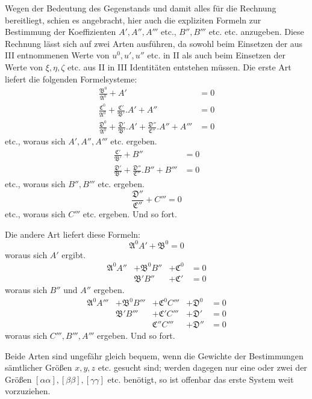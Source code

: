 Wegen der Bedeutung des Gegenstands und damit alles für die Rechnung bereitliegt, schien es angebracht, hier auch die expliziten Formeln zur Bestimmung der Koeffizienten \(A',A'',A'''\) etc., \(B'',B'''\) etc. etc. anzugeben. Diese Rechnung lässt sich auf zwei Arten ausführen, da sowohl beim Einsetzen der aus III entnommenen Werte von \(u^0,u',u''\) etc. in II als auch beim Einsetzen der Werte von \(\xi,\eta,\zeta\) etc. aus II in III Identitäten entstehen müssen. Die erste Art liefert die folgenden Formelsysteme:
\[
\begin{aligned}
\frac{\mathfrak{B}^0}{\mathfrak{A}^0}+A'&=0\\[4pt]
\frac{\mathfrak{C}^0}{\mathfrak{A}^0}+\frac{\mathfrak{C}'}{\mathfrak{B}'}.A'+A''&=0\\[4pt]
\frac{\mathfrak{D}^0}{\mathfrak{A}^0}+\frac{\mathfrak{D}'}{\mathfrak{B}'}.A'+\frac{\mathfrak{D}''}{\mathfrak{C}''}.A''+A'''&=0
\end{aligned}
\]
etc., woraus sich \(A',A'',A'''\) etc. ergeben.
\[
\begin{aligned}
\frac{\mathfrak{C}'}{\mathfrak{B}'}+B''&=0\\[4pt]
\frac{\mathfrak{D}'}{\mathfrak{B}'}+\frac{\mathfrak{D}''}{\mathfrak{C}''}.B''+B'''&=0
\end{aligned}
\]
etc., woraus sich \(B'',B'''\) etc. ergeben.
\[
\frac{\mathfrak{D}''}{\mathfrak{C}''}+C'''=0
\]
etc., woraus sich \(C'''\) etc. ergeben. Und so fort.

Die andere Art liefert diese Formeln:
\[
\mathfrak{A}^0A'+\mathfrak{B}^0=0
\]
woraus sich \(A'\) ergibt.
\[
\begin{array}{rllll}
\mathfrak{A}^0A''&+\mathfrak{B}^0B''&+\mathfrak{C}^0&=0\\
&\mathfrak{B}'B''&+\mathfrak{C}'&=0
\end{array}
\]
woraus sich \(B''\) und \(A''\) ergeben.
\[
\begin{array}{rlllll}
\mathfrak{A}^0A'''&+\mathfrak{B}^0B'''&+\mathfrak{C}^0C'''&+\mathfrak{D}^0&=0\\
&\mathfrak{B}'B'''&+\mathfrak{C}'C'''&+\mathfrak{D}'&=0\\
&&\mathfrak{C}''C'''&+\mathfrak{D}''&=0
\end{array}
\]
woraus sich \(C''',B''',A'''\) ergeben. Und so fort.

Beide Arten sind ungefähr gleich bequem, wenn die Gewichte der Bestimmungen sämtlicher Größen \(x,y,z\) etc. gesucht sind; werden dagegen nur eine oder zwei der Größen \([\alpha\alpha],\allowbreak[\beta\beta],\allowbreak[\gamma\gamma]\) etc. benötigt, so ist offenbar das erste System weit vorzuziehen.

